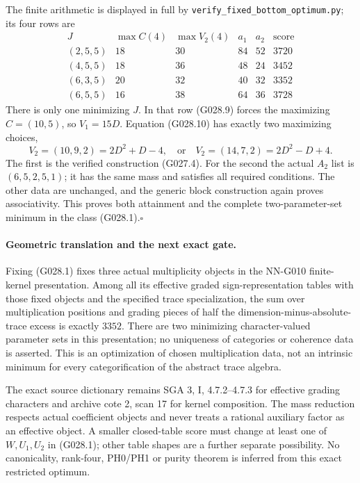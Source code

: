 The finite arithmetic is displayed in full by
\texttt{verify\_fixed\_bottom\_optimum.py}; its four
rows are
\[
\begin{array}{c|c|c|c|c|r}
 J&\max C(4)&\max V_2(4)&a_1&a_2&\text{score}\\\hline
 (2,5,5)&18&30&84&52&3720\\
 (4,5,5)&18&36&48&24&3452\\
 (6,3,5)&20&32&40&32&3352\\
 (6,5,5)&16&38&64&36&3728
\end{array}                                                         \tag{G028.11}
\]
There is only one minimizing $J$. In that row (G028.9)
forces the maximizing $C=(10,5)$, so $V_1=15D$.
Equation (G028.10) has exactly two maximizing choices,
\[
 V_2=(10,9,2)=2D^2+D-4,
 \quad\text{or}\quad
 V_2=(14,7,2)=2D^2-D+4.
\]
The first is the verified construction (G027.4).
For the second the actual $A_2$ list is
$(6,5,2,5,1)$; it has the same mass and satisfies
all required conditions. The other data are unchanged,
and the generic block construction again proves
associativity. This proves both attainment and the
complete two-parameter-set minimum in the class
(G028.1).\hfill$\square$

\paragraph{Geometric translation and the next exact gate.}
Fixing (G028.1) fixes three actual multiplicity objects
in the NN-G010 finite-kernel presentation. Among all
its effective graded sign-representation tables with
those fixed objects and the specified trace specialization,
the sum over multiplication positions and grading pieces
of half the dimension-minus-absolute-trace excess is
exactly $3352$. There are two minimizing character-valued
parameter sets in this presentation; no uniqueness of
categories or coherence data is asserted. This is an
optimization of chosen multiplication data, not an
intrinsic minimum for every categorification of the
abstract trace algebra.

The exact source dictionary remains SGA 3, I,
4.7.2--4.7.3 for effective grading characters and
archive cote 2, scan 17 for kernel composition.
The mass reduction respects actual coefficient
objects and never treats a rational auxiliary factor
as an effective object. A smaller closed-table score
must change at least one of $W,U_1,U_2$ in (G028.1);
other table shapes are a further separate possibility.
No canonicality, rank-four, PH0/PH1 or purity theorem
is inferred from this exact restricted optimum.

